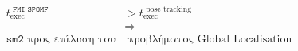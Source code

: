 \begin{frame}{}


  \begin{align}
    t_\text{exec}^{\texttt{\ FMI\_SPOMF}} &> t^\text{\ pose tracking}_\text{exec} \nonumber \\
     & \Rightarrow \nonumber \\
     \texttt{sm2} \text{ προς επίλυση του} & \text{ προβλήματος Global Localisation} \nonumber
  \end {align}



\end{frame}

